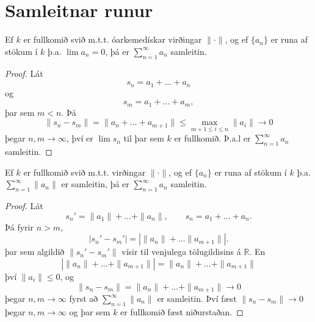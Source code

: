 
\section*{Samleitnar runur}
\begin{setn}
Ef $k$ er fullkomið svið m.t.t. óarkemedískar virðingar $\| \cdot  \|$, og ef $\{ a_n \} $ er 
runa af stökum í $k$ þ.a. $\lim a_n = 0$, þá er $\sum_{n=1}^\infty a_n$ samleitin.
\end{setn}
\begin{proof}
Lát 
\begin{equation*}
s_n = a_1+ \ldots + a_n
\end{equation*}
og
\begin{equation*}
s_m = a_1 + \ldots + a_m,
\end{equation*}
þar sem $m < n$. Þá
\begin{equation*}
\|s_n - s_m \| = \| a_n + \ldots + a_{m+1} \| \leq \max_{m+1 \leq i \leq n} \|a_i\| \rightarrow 0
\end{equation*}
þegar $n,m \rightarrow \infty$, því er $\lim s_n$ til þar sem $k$ er fullkomið. Þ.a.l er $\sum_{n=1}^\infty a_n$ samleitin.
\end{proof}

\begin{setn}
Ef $k$ er fullkomið svið m.t.t. virðingar $\| \cdot \|$, og ef $\{ a_n \}$ er runa af stökum í $k$ 
þ.a. $\sum_{n=1}^{\infty} \| a_n \| $ er samleitin, þá er $\sum_{n=1}^\infty a_n $ samleitin. 
\end{setn}
\begin{proof}
Lát 
\begin{equation*}
 s_n' = \| a_1 \| + \ldots + \|a_n\|, \qquad s_n = a_1 + \ldots + a_n.
\end{equation*}
Þá fyrir $n>m$, 
\begin{equation*}
|s_n'- s_m' | = | \| a_n \| + \ldots \|a_{m+1}\| |.
\end{equation*}
þar sem algildið $\| s_n' - s_m' \| $ vísir til venjulega  tölugildisins á $\mathbb{R}$. En 
\begin{equation*}
| \| a_n \| + \ldots + \| a_{m+1} \| | = \| a_n \| + \ldots + \| a_{m+1} \|
\end{equation*}
því $\| a_i \| \leq 0$, og 
\begin{equation}
\| s_n - s_m \| = \|a_n\| + \ldots + \|a_{m+1}\| \rightarrow 0
\end{equation}
þegar $n,m \rightarrow \infty$ fyrst að $\sum_{n=1}^\infty \|a_n\|$ er samleitin. 
Því fæst $\|s_n - s_m \| \rightarrow 0$ þegar $n,m \rightarrow \infty $ og þar sem $k$ er fullkomið fæst niðurstaðan.  
\end{proof}


